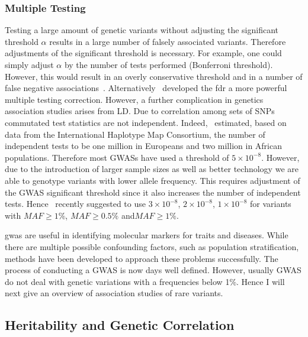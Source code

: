 \subsubsection{Multiple Testing}
\label{ssub:multiple_testing}
Testing a large amount of genetic variants without adjusting the significant threshold $\alpha$ results in a large number of falsely associated variants.
Therefore adjustments of the significant threshold is necessary.
For example, one could simply adjust $\alpha$ by the number of tests performed (Bonferroni threshold).
However, this would result in an overly conservative threshold and in a number of false negative associations~\cite{Benjamini1995}.
Alternatively~\citet{Benjamini1995} developed the \acrfull{fdr} a more powerful multiple testing correction. 
However, a further complication in genetics association studies arises from LD\@.
Due to correlation among sets of SNPs commutated test statistics are not independent.
Indeed,~\citet{Peer2008} estimated, based on data from the International Haplotype Map Consortium, the number of independent tests to be one million in Europeans and two million in African populations.
Therefore most GWASs have used a threshold of $5\times 10^{-8}$.
However, due to the introduction of larger sample sizes as well as better technology we are able to genotype variants with lower allele frequency.
This requires adjustment of the GWAS significant threshold since it also increases the number of independent tests.
Hence~\citet{Fadista2016} recently suggested to use $3\times10^{-8}$, $2\times10^{-8}$, $1\times10^{-8}$ for variants with $MAF\ge1\%$, $MAF\ge0.5\%$ and$ MAF\ge1\%$.

\acrshort{gwas} are useful in identifying molecular markers for traits and diseases.
While there are multiple possible confounding factors, such as population stratification, methods have been developed to approach these problems successfully.
The process of conducting a GWAS is now days well defined.
However, usually GWAS do not deal with genetic variations with a frequencies below 1\%.
Hence I will next give an overview of association studies of rare variants.

\subsection{Heritability and Genetic Correlation}
\label{sub:heritability_and_genetic_correlation}


